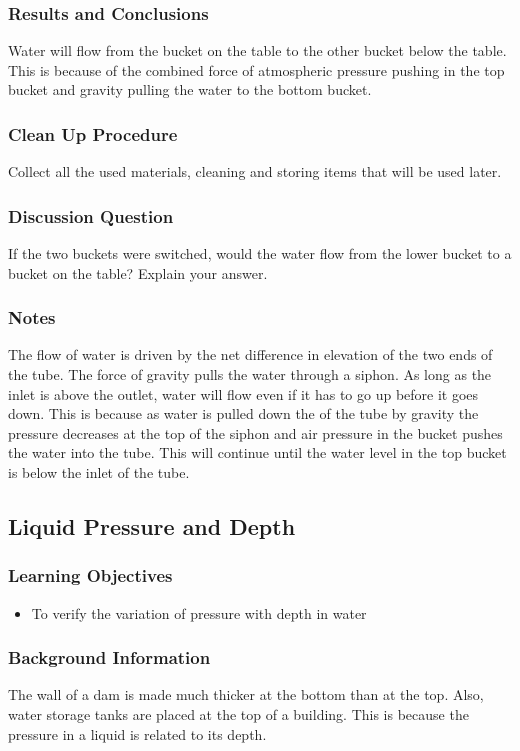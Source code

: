 \subsubsection*{Results and Conclusions}
Water will flow from the bucket on the table to the other bucket below the table. This is because of the combined force of atmospheric pressure pushing in the top bucket and gravity pulling the water to the bottom bucket.

\subsubsection*{Clean Up Procedure}
Collect all the used materials, cleaning and storing items that will be used later.

\subsubsection*{Discussion Question}
If the two buckets were switched, would the water flow from the lower bucket to a bucket on the table? Explain your answer.

\subsubsection*{Notes}
The flow of water is driven by the net difference in elevation of the two ends of the tube. The force of gravity pulls the water through a siphon. As long as the inlet is above the outlet, water will flow even if it has to go up before it goes down. This is because as water is pulled down the of the tube by gravity the pressure decreases at the top of the siphon and air pressure in the bucket pushes the water into the tube. This will continue until the water level in the top bucket is below the inlet of the tube.

\subsection{Liquid Pressure and Depth}

\subsubsection*{Learning Objectives}
\begin{itemize}
\item{To verify the variation of pressure with depth in water} 
\end{itemize}

\subsubsection*{Background Information}
The wall of a dam is made much thicker at the bottom than at the top. Also, water storage tanks are placed at the top of a building. This is because the pressure in a liquid is related to its depth.

